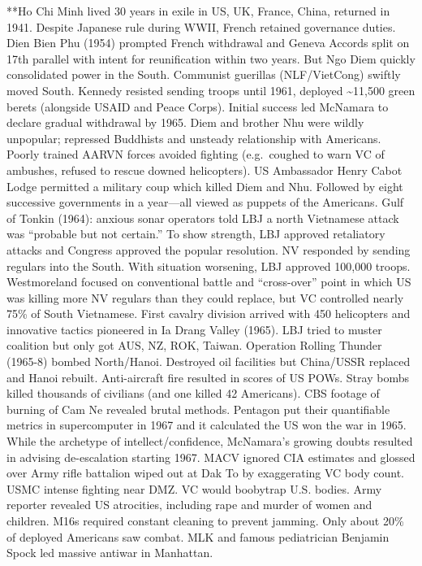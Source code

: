 \documentclass[
]{article}
\begin{document}
**Ho Chi Minh lived 30 years in exile in US, UK, France, China, returned
in 1941. Despite Japanese rule during WWII, French retained governance
duties. Dien Bien Phu (1954) prompted French withdrawal and Geneva
Accords split on 17th parallel with intent for reunification within two
years. But Ngo Diem quickly consolidated power in the South. Communist
guerillas (NLF/VietCong) swiftly moved South. Kennedy resisted sending
troops until 1961, deployed \textasciitilde11,500 green berets
(alongside USAID and Peace Corps). Initial success led McNamara to
declare gradual withdrawal by 1965. Diem and brother Nhu were wildly
unpopular; repressed Buddhists and unsteady relationship with Americans.
Poorly trained AARVN forces avoided fighting (e.g.~coughed to warn VC of
ambushes, refused to rescue downed helicopters). US Ambassador Henry
Cabot Lodge permitted a military coup which killed Diem and Nhu.
Followed by eight successive governments in a year---all viewed as
puppets of the Americans. Gulf of Tonkin (1964): anxious sonar operators
told LBJ a north Vietnamese attack was ``probable but not certain.'' To
show strength, LBJ approved retaliatory attacks and Congress approved
the popular resolution. NV responded by sending regulars into the South.
With situation worsening, LBJ approved 100,000 troops. Westmoreland
focused on conventional battle and ``cross-over'' point in which US was
killing more NV regulars than they could replace, but VC controlled
nearly 75\% of South Vietnamese. First cavalry division arrived with 450
helicopters and innovative tactics pioneered in Ia Drang Valley (1965).
LBJ tried to muster coalition but only got AUS, NZ, ROK, Taiwan.
Operation Rolling Thunder (1965-8) bombed North/Hanoi. Destroyed oil
facilities but China/USSR replaced and Hanoi rebuilt. Anti-aircraft fire
resulted in scores of US POWs. Stray bombs killed thousands of civilians
(and one killed 42 Americans). CBS footage of burning of Cam Ne revealed
brutal methods. Pentagon put their quantifiable metrics in supercomputer
in 1967 and it calculated the US won the war in 1965. While the
archetype of intellect/confidence, McNamara's growing doubts resulted in
advising de-escalation starting 1967. MACV ignored CIA estimates and
glossed over Army rifle battalion wiped out at Dak To by exaggerating VC
body count. USMC intense fighting near DMZ. VC would boobytrap U.S.
bodies. Army reporter revealed US atrocities, including rape and murder
of women and children. M16s required constant cleaning to prevent
jamming. Only about 20\% of deployed Americans saw combat. MLK and
famous pediatrician Benjamin Spock led massive antiwar in Manhattan.
\end{document}
